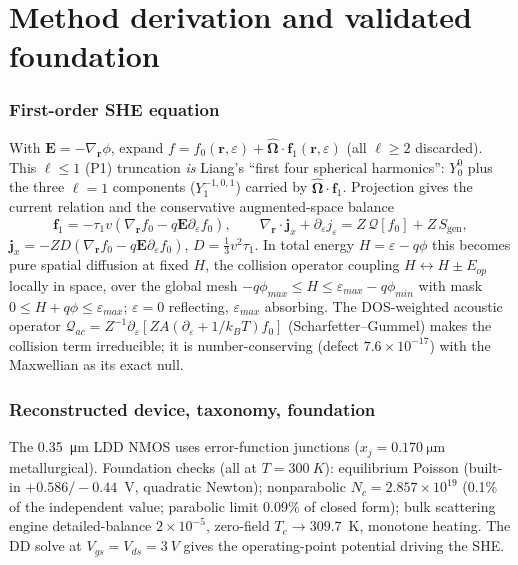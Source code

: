 \documentclass[11pt]{article}
\newcommand{\eps}{\varepsilon}
\newcommand{\vecr}{\mathbf{r}}
\newcommand{\vecE}{\mathbf{E}}
\newcommand{\vecj}{\mathbf{j}}
\newcommand{\Om}{\hat{\boldsymbol{\Omega}}}
\newcommand{\gradr}{\nabla_{\!\vecr}}
\begin{document}
\part{Method derivation and validated foundation}

\section{First-order SHE equation}\label{sec:derivation}
With $\vecE=-\gradr\phi$, expand $f=f_0(\vecr,\eps)+\Om\cdot\mathbf{f}_1(\vecr,\eps)$ (all
$\ell\ge2$ discarded). This $\ell\le1$ (P1) truncation \emph{is} Liang's ``first four spherical
harmonics'': $Y_0^0$ plus the three $\ell=1$ components ($Y_1^{-1,0,1}$) carried by
$\Om\cdot\mathbf{f}_1$. Projection gives the current relation and the conservative
augmented-space balance
\begin{equation}
\mathbf{f}_1=-\tau_1 v(\gradr f_0-q\vecE\partial_\eps f_0),\qquad
\gradr\!\cdot\vecj_x+\partial_\eps j_\eps= Z\,\mathcal{Q}[f_0]+Z\,S_{\text{gen}},
\end{equation}
$\vecj_x=-ZD(\gradr f_0-q\vecE\partial_\eps f_0)$, $D=\tfrac13v^2\tau_1$. In total energy
$H=\eps-q\phi$ this becomes pure spatial diffusion at fixed $H$, the collision operator coupling
$H\!\leftrightarrow\!H\pm E_{op}$ locally in space, over the global mesh $-q\phi_{max}\le H\le
\eps_{max}-q\phi_{min}$ with mask $0\le H+q\phi\le\eps_{max}$; $\eps=0$ reflecting, $\eps_{max}$
absorbing. The DOS-weighted acoustic operator $\mathcal{Q}_{ac}=Z^{-1}\partial_\eps[ZA(\partial_
\eps+1/k_BT)f_0]$ (Scharfetter--Gummel) makes the collision term irreducible; it is
number-conserving (defect $7.6\times10^{-17}$) with the Maxwellian as its exact null.

\section{Reconstructed device, taxonomy, foundation}\label{sec:device}
The \SI{0.35}{\micro\meter} LDD NMOS uses error-function junctions ($x_j=\SI{0.170}{\micro
\meter}$ metallurgical). Foundation checks (all at $T=\SI{300}{K}$): equilibrium Poisson (built-in
$+0.586/-0.44$~V, quadratic Newton); nonparabolic $N_c=2.857\times10^{19}$ (0.1\% of the
independent value; parabolic limit 0.09\% of closed form); bulk scattering engine
detailed-balance $2\times10^{-5}$, zero-field $T_e\to309.7$~K, monotone heating. The DD solve
at $V_{gs}=V_{ds}=\SI{3}{V}$ gives the operating-point potential driving the SHE.
\end{document}
